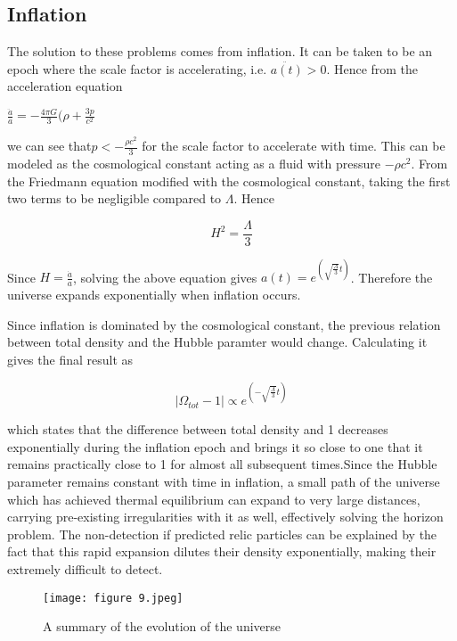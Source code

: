  \subsection{Inflation}
 The solution to these problems comes from inflation. It can be taken to be an epoch where the scale factor is accelerating, i.e. $\ddot{a(t)}>0$. 
 Hence from the acceleration equation 
 
 \begin{center}
     $\frac{\ddot{a}}{a} = -\frac{4{\pi}G}{3}(\rho + \frac{3p}{c^2}$
 \end{center}

we can see that$p<-\frac{{\rho}c^2}{3}$ for the scale factor to accelerate with time. This can be modeled as the cosmological constant acting as a  fluid with pressure $-{\rho}c^2$. From the Friedmann equation modified with the cosmological constant, taking the first two terms to be negligible compared to $\Lambda$. Hence 

\begin{equation}
    H^2 = \frac{\Lambda}{3}
\end{equation}

Since $H = \frac{\dot{a}}{a}$, solving the above equation gives $a(t) = e^{({\sqrt{\frac{\Lambda}{3}}t})}$. Therefore the universe expands exponentially when inflation occurs.

Since inflation is dominated by the cosmological constant, the previous relation between total density and the Hubble paramter would change. Calculating it gives the final result as 

\begin{equation}
    |\Omega_{tot}-1| \propto e^{(-{\sqrt{\frac{\Lambda}{3}}t})}
\end{equation}

which states that the difference between total density and 1 decreases exponentially during the inflation epoch and brings it so close to one that it remains practically close to 1 for almost all subsequent times.Since the Hubble parameter remains constant with time in inflation, a small path of the universe which has achieved thermal equilibrium can expand to very large distances, carrying pre-existing irregularities with it as well, effectively solving the horizon problem. The non-detection if predicted relic particles can be explained by the fact that this rapid expansion dilutes their density exponentially, making their extremely difficult to detect.
\\
\begin{figure}[H]
    \centering
    \texttt{[image: figure 9.jpeg]}
    \caption{A summary of the evolution of the universe}
    \label{fig:final}
\end{figure}

\newpage